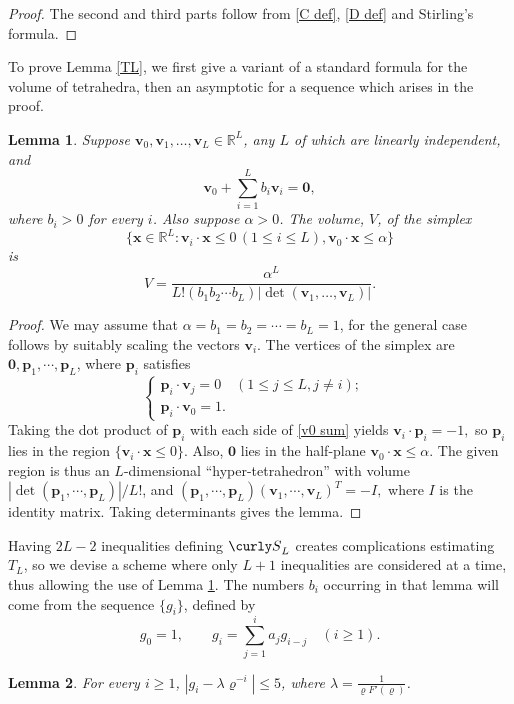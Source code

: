 \documentclass[11pt]{amsart}
\theoremstyle{remark}
\theoremstyle{plain}
\newtheorem{lem}{Lemma}[section]
\numberwithin{equation}{section}
\newcommand{\RR}{{\mathbb R}}
\newcommand{\be}{\begin{equation}}
\newcommand{\ee}{\end{equation}}
\newcommand{\lam}{\ensuremath{\lambda}}
\renewcommand{\a}{\ensuremath{\alpha}}
\renewcommand{\(}{\left(}
\renewcommand{\)}{\right)}
\newcommand{\fancyS}{{\curly S}}
\renewcommand{\le}{\leqslant}
\renewcommand{\ge}{\geqslant}
\renewcommand{\rho}{\varrho}
\newcommand{\vx}{\mathbf{x}}
\newcommand{\vv}{\mathbf{v}}
\newcommand{\vz}{\mathbf{0}}
\newcommand{\vp}{\mathbf{p}}
\begin{document}
\begin{proof}
The second and third parts follow from \eqref{C def}, \eqref{D def} and
Stirling's formula.
\end{proof}

To prove Lemma \ref{TL}, we first give a variant of a standard formula for the volume of
tetrahedra, then an asymptotic for a sequence which arises in the proof.

\begin{lem}\label{volume} Suppose $\vv_0, \vv_1, \ldots, \vv_L \in
\RR^L$, any $L$ of which are linearly independent, and
\be\label{v0 sum}
\vv_0 + \sum_{i=1}^L b_i \vv_i = \vz, 
\ee
where $b_i >0$ for every $i$.  Also suppose $\a>0$.
  The volume, $V$, of the simplex
$$
\{ \vx\in \RR^L : \vv_i \cdot \vx \le 0\, (1\le i \le L),
\vv_0 \cdot \vx \le \a \}
$$
is
$$
V = \frac{\a^L}{L! (b_1 b_2 \cdots b_L) |\det(\vv_1, \ldots, \vv_L)|}.
$$
\end{lem}

\begin{proof}
We may assume that $\a=b_1=b_2=\cdots=b_L=1$,
for the general case follows by suitably scaling the vectors $\vv_i$.
The vertices of the simplex are $\vz,\vp_1, \cdots, \vp_L$, where $\vp_i$ satisfies
\[
\begin{cases}
\vp_i \cdot \vv_j = 0 \quad (1\le j\le L, j\ne i); &\\
\vp_i \cdot \vv_0 = 1.&
\end{cases}
\]
Taking the dot product of $\vp_i$ with each side of \eqref{v0 sum} yields
$\vv_i \cdot \vp_i = -1,$ so $\vp_i$
lies in the region $\{\vv_i \cdot \vx \le 0 \}$.  Also, $\vz$ lies in 
the half-plane $\vv_0\cdot \vx \le \a$.
  The given region is thus an
$L$-dimensional ``hyper-tetrahedron'' with volume
$|\det(\vp_1, \cdots,\vp_L)|/L!$, and
$(\vp_1, \cdots, \vp_L) (\vv_1, \cdots, \vv_L)^{T} = -I,$
where $I$ is the identity matrix.  Taking determinants gives the lemma.
\end{proof}

Having $2L-2$ inequalities defining $\fancyS_L$ creates complications
estimating $T_L$, so we devise a scheme where only $L+1$ inequalities
are considered at a time, thus allowing the use of Lemma \ref{volume}.
The numbers $b_i$ occurring in that lemma will come from the sequence
$\{g_i\}$, defined by
\be\label{g def}
g_0=1, \qquad g_i = \sum_{j=1}^i a_j g_{i-j} \quad (i\ge 1). 
\ee

\begin{lem}\label{gh} For every $i\ge 1$,
$\displaystyle |g_i - \lam \rho^{-i}| \le 5$, where 
$\lam=\frac1{\rho F'(\rho)}$.
\end{lem}
\end{document}
